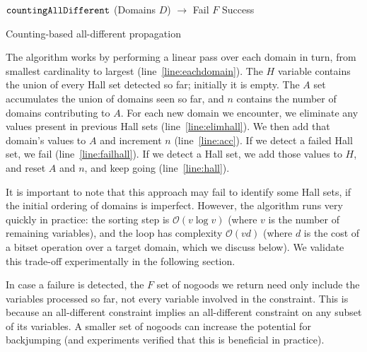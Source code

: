 \documentclass{llncs}
\newcommand{\lineref}[1]{line~\ref{#1}}
\begin{document}
\begin{algorithm}[t]
\DontPrintSemicolon
\nl $\FuncSty{countingAllDifferent}$ (Domains $D$) $\rightarrow$ Fail $F$  Success \;
\nl {}
\caption{Counting-based all-different propagation}
\label{algorithm:cad}
\end{algorithm}

The algorithm works by performing a linear pass over each domain in turn, from smallest cardinality
to largest (\lineref{line:eachdomain}). The $H$ variable contains the union of every Hall set
detected so far; initially it is empty. The $A$ set accumulates the union of domains seen so far,
and $n$ contains the number of domains contributing to $A$. For each new domain we encounter, we
eliminate any values present in previous Hall sets (\lineref{line:elimhall}). We then add that
domain's values to $A$ and increment $n$ (\lineref{line:acc}). If we detect a failed Hall set, we
fail (\lineref{line:failhall}).  If we detect a Hall set, we add those values to $H$, and reset $A$
and $n$, and keep going (\lineref{line:hall}).

It is important to note that this approach may fail to identify some Hall sets, if the initial
ordering of domains is imperfect. However, the algorithm runs very quickly in practice: the
sorting step is $\mathcal{O}(v \log{} v)$ (where $v$ is the number of remaining variables), and the
loop has complexity $\mathcal{O}(v d)$ (where $d$ is the cost of a bitset operation over a target
domain, which we discuss below). We validate this trade-off experimentally in the following section.

In case a failure is detected, the $F$ set of nogoods we return need only include the variables
processed so far, not every variable involved in the constraint. This is because an all-different
constraint implies an all-different constraint on any subset of its variables. A smaller set of
nogoods can increase the potential for backjumping (and experiments verified that this is beneficial
in practice).
\end{document}
